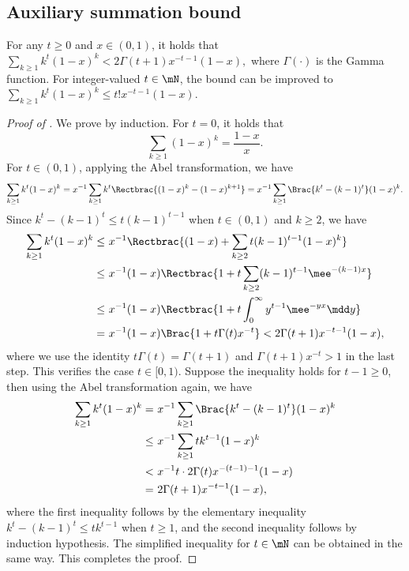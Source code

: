 \documentclass[11pt]{article}
\begin{document}
\subsection{Auxiliary summation bound}
\label{app:Li_ctrl}

\begin{lem}
\label{lem:Li_ctrl}
For any $t\ge 0$ and $x\in(0,1)$, it holds that
\(
    \sum_{k\ge 1} k^t (1-x)^k < 2 \Gamma(t+1) x^{-t-1} (1-x),
\)
where $\Gamma(\cdot)$ is the Gamma function. For integer-valued $t\in\mN$, the bound can be improved to
\(
    \sum_{k\ge 1} k^t (1-x)^k \le t! x^{-t-1} (1-x).
\)
\end{lem}

\begin{proof}[Proof of ]
We prove by induction. For $t=0$, it holds that 
\[
    \sum_{k\ge 1} (1-x)^k = \frac{1-x}{x}. 
\]
For $t\in(0,1)$, applying the Abel transformation, we have
\[
    \sum_{k\ge 1} k^t (1-x)^k = x^{-1} \sum_{k\ge 1} k^t \Rectbrac{ (1-x)^k - (1-x)^{k+1} } = x^{-1} \sum_{k\ge 1} \Brac{ k^t - (k-1)^t } (1-x)^k. 
\]
Since $k^t - (k-1)^t \le t (k-1)^{t-1}$ when $t\in(0,1)$ and $k\ge 2$, we have
\begin{align*}
    \sum_{k\ge 1} k^t (1-x)^k \le~& x^{-1} \Rectbrac{ (1-x) + \sum_{k\ge 2} t (k-1)^{t-1} (1-x)^k } \\
    \le~& x^{-1} (1-x) \Rectbrac{ 1 + t \sum_{k\ge 2} (k-1)^{t-1} \mee^{-(k-1)x} } \\
    \le~& x^{-1} (1-x) \Rectbrac{ 1 + t \int_0^\infty y^{t-1} \mee^{-yx} \mdd y } \\
    =~& x^{-1} (1-x) \Brac{ 1 + t \Gamma(t) x^{-t} } < 2 \Gamma(t+1) x^{-t-1} (1-x),
\end{align*}
where we use the identity $t\Gamma(t) = \Gamma(t+1)$ and $\Gamma(t+1)x^{-t}>1$ in the last step. This verifies the case $t\in[0,1)$. Suppose the inequality holds for $t-1\ge 0$, then using the Abel transformation again, we have
\begin{align*}
    \sum_{k\ge 1} k^t (1-x)^k =~& x^{-1} \sum_{k\ge 1} \Brac{ k^t - (k-1)^t } (1-x)^k \\
    \le ~& x^{-1} \sum_{k\ge 1} t k^{t-1} (1-x)^k \\
    <~& x^{-1} t \cdot 2 \Gamma(t) x^{-(t-1)-1} (1-x) \\ =~& 2 \Gamma(t+1) x^{-t-1} (1-x),
\end{align*}
where the first inequality follows by the elementary inequality $k^t - (k-1)^t \le t k^{t-1}$ when $t\ge 1$, and the second inequality follows by induction hypothesis. The simplified inequality for $t\in\mN$ can be obtained in the same way. This completes the proof. 
\end{proof}
\end{document}
